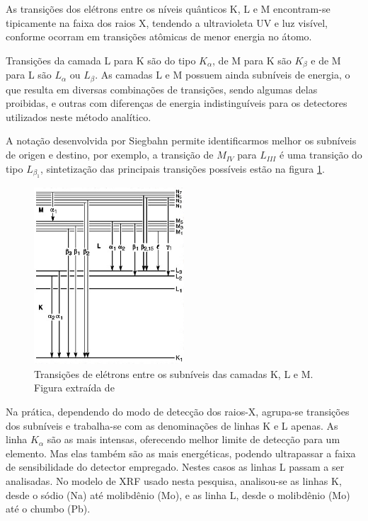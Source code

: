 As transições dos elétrons entre os níveis quânticos K, L e M encontram-se 
tipicamente na faixa dos raios X, tendendo a ultravioleta UV e luz visível,
conforme ocorram em transições atômicas de menor energia no átomo.

Transições da camada L para K são do tipo $K_{\alpha}$, de M para K 
são $K_{\beta}$ e de M para L são $L_{\alpha}$ ou $L_{\beta}$. 
As camadas L e M possuem ainda subníveis de energia, o que resulta em diversas
combinações de transições, sendo algumas delas proibidas, e outras 
com diferenças de energia indistinguíveis para os detectores utilizados 
neste método analítico.

A notação desenvolvida por Siegbahn \citep{jenkins1991} permite identificarmos 
melhor os subníveis de origen e destino, por exemplo, a transição de $M_{IV}$ 
para $L_{III}$ é uma transição do tipo $L_{\beta_1}$, sintetização das 
principais transições possíveis estão na figura \ref{fig:siegbahn}. 

\begin{figure}[H]
\begin{center} 
  \includegraphics[width=0.5\textwidth]{../inputs/images/Siegbahn.jpg}
  \caption{Transições de elétrons entre os subníveis das camadas K, L e M. 
           Figura extraída de \citet{jenkins1991} \label{fig:siegbahn}}
\end{center}
\end{figure}

Na prática, dependendo do modo de detecção dos raios-X, agrupa-se transições 
dos subníveis e trabalha-se com as denominações de linhas K e L apenas. As linha
$K_{\alpha}$ são as mais intensas, oferecendo melhor limite de detecção
para um elemento. Mas elas também são as mais energéticas, podendo ultrapassar a
faixa de sensibilidade do detector empregado. Nestes casos as linhas L passam a 
ser analisadas. No modelo de XRF usado nesta pesquisa, analisou-se as linhas K, 
desde o sódio (Na) até molibdênio (Mo), e as linha L, desde o molibdênio (Mo)
até o chumbo (Pb).  
 
